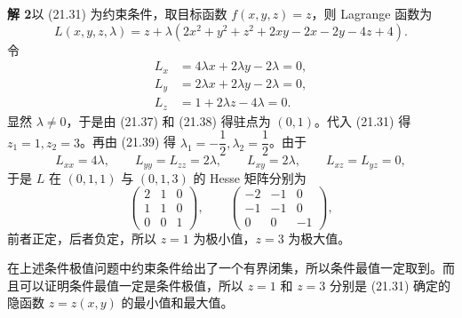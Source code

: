 \begin{xsolution}
\textbf{解 2}\quad 以 (21.31) 为约束条件，取目标函数 $f(x,y,z)=z$，则 Lagrange 函数为
\[
  L(x,y,z,\lambda)=z+\lambda(2x^2+y^2+z^2+2xy-2x-2y-4z+4).
\]
令
\begin{align}
  L_x&=4\lambda x+2\lambda y-2\lambda=0, \tag{21.37}\label{eq:21.37}\\
  L_y&=2\lambda x+2\lambda y-2\lambda=0, \tag{21.38}\label{eq:21.38}\\
  L_z&=1+2\lambda z-4\lambda=0. \tag{21.39}\label{eq:21.39}
\end{align}
显然 $\lambda\ne0$，于是由 (21.37) 和 (21.38) 得驻点为 $(0,1)$。代入 (21.31) 得 $z_1=1,z_2=3$。再由 (21.39) 得 $\lambda_1=-\dfrac12,\lambda_2=\dfrac12$。由于
\[
  L_{xx}=4\lambda,\qquad L_{yy}=L_{zz}=2\lambda,
  \qquad L_{xy}=2\lambda,\qquad L_{xz}=L_{yz}=0,
\]
于是 $L$ 在 $(0,1,1)$ 与 $(0,1,3)$ 的 Hesse 矩阵分别为
\[
  \begin{pmatrix}2&1&0\\1&1&0\\0&0&1\end{pmatrix},
  \qquad
  \begin{pmatrix}-2&-1&0\\-1&-1&0\\0&0&-1\end{pmatrix},
\]
前者正定，后者负定，所以 $z=1$ 为极小值，$z=3$ 为极大值。
\end{xsolution}
\begin{xremark}
在上述条件极值问题中约束条件给出了一个有界闭集，所以条件最值一定取到。而且可以证明条件最值一定是条件极值，所以 $z=1$ 和 $z=3$ 分别是 (21.31) 确定的隐函数 $z=z(x,y)$ 的最小值和最大值。
\end{xremark}

